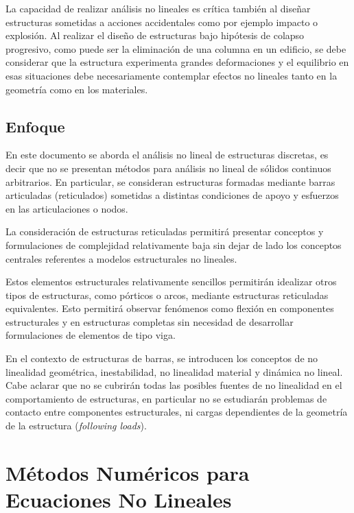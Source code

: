 La capacidad de realizar análisis no lineales es crítica también al diseñar estructuras sometidas a acciones accidentales como por ejemplo impacto o explosión. Al realizar el diseño de estructuras bajo hipótesis de colapso progresivo, como puede ser la eliminación de una columna en un edificio, se debe considerar que la estructura experimenta grandes deformaciones y el equilibrio en esas situaciones debe necesariamente contemplar efectos no lineales tanto en la geometría como en los materiales.

\subsection*{Enfoque}

En este documento se aborda el análisis no lineal de estructuras discretas, es decir que no se presentan métodos para análisis no lineal de sólidos continuos arbitrarios. %
%
En particular, se consideran estructuras formadas mediante barras articuladas (reticulados) sometidas a distintas condiciones de apoyo y esfuerzos en las articulaciones o nodos. %



La consideración de estructuras reticuladas permitirá presentar conceptos y formulaciones de complejidad relativamente baja sin dejar de lado los conceptos centrales referentes a modelos estructurales no lineales. 

Estos elementos estructurales relativamente sencillos permitirán idealizar otros tipos de estructuras, como pórticos o arcos, mediante estructuras reticuladas equivalentes. %
%
Esto permitirá observar fenómenos como flexión en componentes estructurales y en estructuras completas sin necesidad de desarrollar formulaciones de elementos de tipo viga. %

En el contexto de estructuras de barras, se introducen los conceptos de no linealidad geométrica, inestabilidad, no linealidad material y dinámica no lineal. %
%
Cabe aclarar que no se cubrirán todas las posibles fuentes de no linealidad en el comportamiento de estructuras, en particular no se estudiarán problemas de contacto entre componentes estructurales, ni cargas dependientes de la geometría de la estructura (\textit{following loads}).

\section{Métodos Numéricos para Ecuaciones No Lineales} \label{sec:mnecnl}

